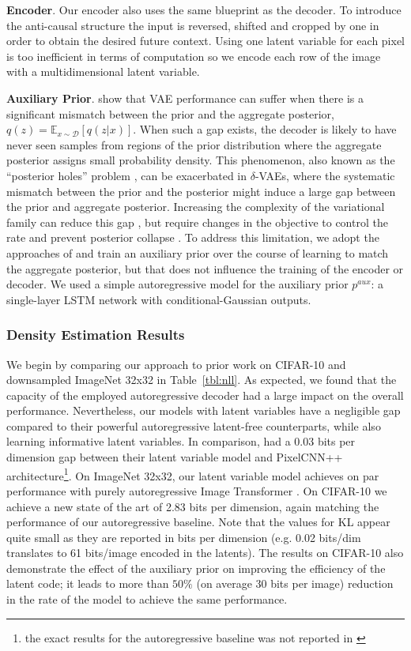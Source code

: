 \documentclass{article} \usepackage{iclr2019_conference,times}
\newcommand{\tblref}[1]{Table~\ref{#1}}
\begin{document}
\par
\textbf{Encoder}. Our encoder also uses the same blueprint as the decoder. To introduce the anti-causal structure the input is reversed, shifted and cropped by one in order to obtain the desired future context. Using one latent variable for each pixel is too inefficient in terms of computation so we encode each row of the image with a multidimensional latent variable.

\par
\textbf{Auxiliary Prior}.
\cite{vamprior, Hoffman2016, Geco} show that VAE performance can suffer when there is a significant mismatch between the
prior and the aggregate posterior, $q(z) = \mathbb{E}_{x\sim \mathcal{D}}\left[q(z|x)\right]$. When such a gap exists, the decoder is likely to have never seen samples from regions of the prior distribution where the aggregate posterior assigns small probability density.
This phenomenon, also known as the ``posterior holes'' problem \citep{Geco}, can be exacerbated in $\delta$-VAEs, where the systematic mismatch between the prior and the posterior might induce a large gap between the prior and aggregate posterior. Increasing the complexity of the variational family can reduce this gap \citep{NF}, but require changes in the objective to control the rate and prevent posterior collapse \citep{IAF}. To address this limitation, we adopt the approaches of \citet{VQVAE, roy2018theory} and train an auxiliary prior over the course of learning to match the aggregate posterior, but that does not influence the training of the encoder or decoder. We used a simple autoregressive model for the auxiliary prior $p^{aux}$: a single-layer LSTM network with conditional-Gaussian outputs.

\subsubsection{Density Estimation Results}
We begin by comparing our approach to prior work on CIFAR-10 and downsampled ImageNet 32x32 in \tblref{tbl:nll}.
As expected, we found that the capacity of the employed autoregressive decoder had a large impact on the overall performance. Nevertheless, our models with latent variables have a negligible gap compared to their powerful autoregressive latent-free counterparts, while also learning informative latent variables. In comparison, \citep{VLAE} had a 0.03 bits per dimension gap between their latent variable model and PixelCNN++ architecture\footnote{the exact results for the autoregressive baseline was not reported in \cite{VLAE}}. On ImageNet 32x32, our latent variable model achieves on par performance with purely autoregressive Image Transformer \citep{ImageTransformer}. On CIFAR-10 we achieve a new state of the art of 2.83 bits per dimension, again matching the performance of our autoregressive baseline. Note that the values for KL appear quite small as they are reported in bits per dimension (e.g. 0.02 bits/dim translates to 61 bits/image encoded in the latents). The results on CIFAR-10 also demonstrate the effect of the auxiliary prior on improving the efficiency of the latent code; it leads to more than $50\%$ (on average 30 bits per image) reduction in the rate of the model to achieve the same performance.
\end{document}
